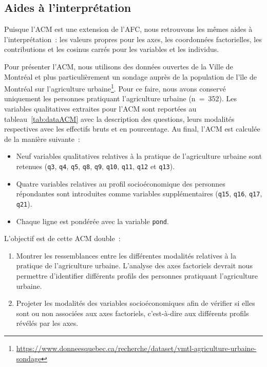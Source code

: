 \documentclass[
  11pt,
  french,
]{book}
\providecommand{\tightlist}{%
  \setlength{\itemsep}{0pt}\setlength{\parskip}{0pt}}
\renewcommand{\href}[2]{#2\footnote{\url{#1}}}
\begin{document}
\hypertarget{sect1241}{%
\subsection{Aides à l'interprétation}\label{sect1241}}

Puisque l'ACM est une extension de l'AFC, nous retrouvons les mêmes aides à l'interprétation~: les valeurs propres pour les axes, les coordonnées factorielles, les contributions et les cosinus carrés pour les variables et les individus.

Pour présenter l'ACM, nous utilisons des données ouvertes de la Ville de Montréal et plus particulièrement un \href{https://www.donneesquebec.ca/recherche/dataset/vmtl-agriculture-urbaine-sondage}{sondage auprès de la population de l'île de Montréal sur l'agriculture urbaine}. Pour ce faire, nous avons conservé uniquement les personnes pratiquant l'agriculture urbaine (n~=~352). Les variables qualitatives extraites pour l'ACM sont reportées au tableau~\ref{tab:dataACM} avec la description des questions, leurs modalités respectives avec les effectifs bruts et en pourcentage. Au final, l'ACM est calculée de la manière suivante~:

\begin{itemize}
\tightlist
\item
  Neuf variables qualitatives relatives à la pratique de l'agriculture urbaine sont retenues (\texttt{q3}, \texttt{q4}, \texttt{q5}, \texttt{q8}, \texttt{q9}, \texttt{q10}, \texttt{q11}, \texttt{q12} et \texttt{q13}).
\item
  Quatre variables relatives au profil socioéconomique des personnes répondantes sont introduites comme variables supplémentaires (\texttt{q15}, \texttt{q16}, \texttt{q17}, \texttt{q21}).
\item
  Chaque ligne est pondérée avec la variable \texttt{pond}.
\end{itemize}

L'objectif est de cette ACM double~:

\begin{enumerate}
\def\labelenumi{\arabic{enumi}.}
\tightlist
\item
  Montrer les ressemblances entre les différentes modalités relatives à la pratique de l'agriculture urbaine. L'analyse des axes factoriels devrait nous permettre d'identifier différents profils des personnes pratiquant l'agriculture urbaine.
\item
  Projeter les modalités des variables socioéconomiques afin de vérifier si elles sont ou non associées aux axes factoriels, c'est-à-dire aux différents profils révélés par les axes.
\end{enumerate}
\end{document}
